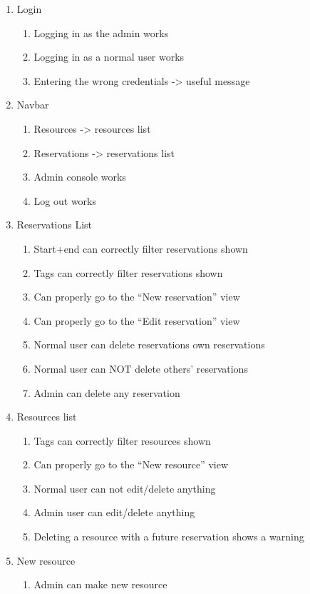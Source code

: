 \documentclass[12pt]{article}
\begin{document}
\begin{enumerate}
	\item Login
	\begin{enumerate}
		\item Logging in as the admin works
		\item Logging in as a normal user works
		\item Entering the wrong credentials -> useful message
	\end{enumerate}
	\item Navbar
	\begin{enumerate}
		\item Resources -> resources list
		\item Reservations -> reservations list
		\item Admin console works
		\item Log out works
	\end{enumerate}
	\item Reservations List
	\begin{enumerate}
		\item Start+end can correctly filter reservations shown
		\item Tags can correctly filter reservations shown
		\item Can properly go to the ``New reservation'' view
		\item Can properly go to the ``Edit reservation'' view
		\item Normal user can delete reservations own reservations
		\item Normal user can NOT delete others' reservations
		\item Admin can delete any reservation
	\end{enumerate}
	\item Resources list
	\begin{enumerate}
		\item Tags can correctly filter resources shown
		\item Can properly go to the ``New resource'' view
		\item Normal user can not edit/delete anything
		\item Admin user can edit/delete anything
		\item Deleting a resource with a future reservation shows a warning
	\end{enumerate}
	\item New resource
	\begin{enumerate}
		\item Admin can make new resource

\end{enumerate}
\end{enumerate}
\end{document}

